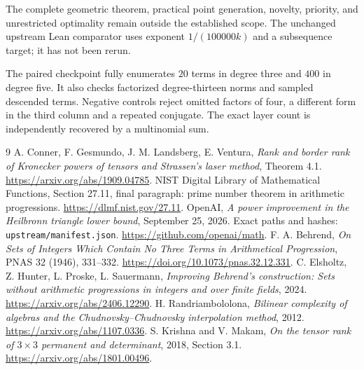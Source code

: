\documentclass[11pt]{article}
\begin{document}
The complete geometric theorem, practical point generation, novelty,
priority, and unrestricted optimality remain outside the established
scope. The unchanged upstream Lean comparator uses exponent
\(1/(100000k)\) and a subsequence target; it has not been rerun.

The paired checkpoint fully enumerates $20$ terms in degree three and
$400$ in degree five. It also checks factorized degree-thirteen norms and
sampled descended terms. Negative controls reject omitted factors of four,
a different form in the third column and a repeated conjugate. The exact
layer count is independently recovered by a multinomial sum.

\begin{thebibliography}{9}
 A. Conner, F. Gesmundo, J. M. Landsberg, E. Ventura,
\emph{Rank and border rank of Kronecker powers of tensors and Strassen's
laser method}, Theorem 4.1. \url{https://arxiv.org/abs/1909.04785}.
 NIST Digital Library of Mathematical Functions,
Section 27.11, final paragraph: prime number theorem in arithmetic
progressions. \url{https://dlmf.nist.gov/27.11}.
 OpenAI, \emph{A power improvement in the Heilbronn
triangle lower bound}, September 25, 2026.
Exact paths and hashes: \texttt{upstream/manifest.json}.
\url{https://github.com/openai/math}.
 F. A. Behrend, \emph{On Sets of Integers Which Contain
No Three Terms in Arithmetical Progression}, PNAS 32 (1946), 331--332.
\url{https://doi.org/10.1073/pnas.32.12.331}.
 C. Elsholtz, Z. Hunter, L. Proske, L. Sauermann,
\emph{Improving Behrend's construction: Sets without arithmetic
progressions in integers and over finite fields}, 2024.
\url{https://arxiv.org/abs/2406.12290}.
 H. Randriambololona,
\emph{Bilinear complexity of algebras and the Chudnovsky--Chudnovsky
interpolation method}, 2012.
\url{https://arxiv.org/abs/1107.0336}.
 S. Krishna and V. Makam,
\emph{On the tensor rank of $3\times3$ permanent and determinant}, 2018,
Section 3.1. \url{https://arxiv.org/abs/1801.00496}.
\end{thebibliography}
\end{document}
